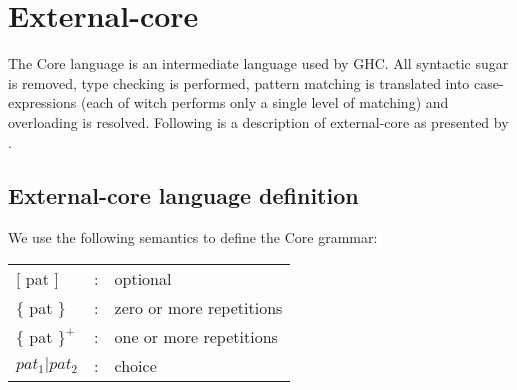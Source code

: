 
\section{External-core}

The Core language is an intermediate language used by GHC.
All syntactic sugar is removed, type checking is performed, pattern matching is
translated into case-expressions (each of witch performs only a single level of
matching) and overloading is resolved.\cite{jones1992implementing} Following
is a description of external-core as presented by \cite{tolmach2010ghc}.

\subsection{External-core language definition}

We use the following semantics to define the Core grammar:

\begin{longtable}{ l c l }

$[$ pat $]$		& :	& optional			\\
$\{$ pat $\}$		& :	& zero or more repetitions	\\
$\{$ pat $\}^{+}$	& :	& one or more repetitions	\\
$pat_{1}|pat_{2}$	& :	& choice			\\

\end{longtable}

